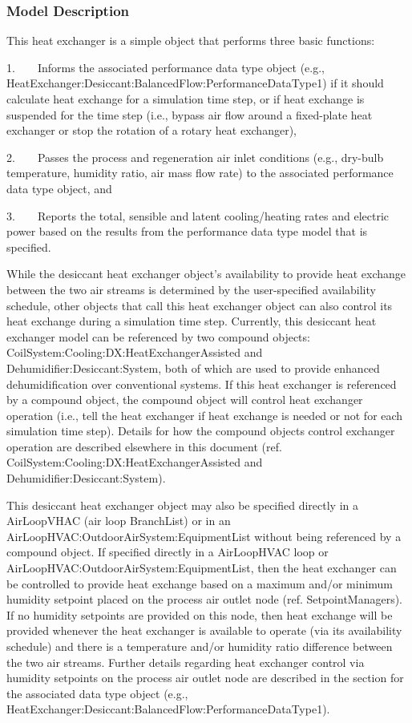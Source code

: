 \subsubsection{Model Description}\label{model-description-2-006}

This heat exchanger is a simple object that performs three basic functions:

1.~~~~Informs the associated performance data type object (e.g., \\ HeatExchanger:Desiccant:BalancedFlow:PerformanceDataType1) if it should calculate heat exchange for a simulation time step, or if heat exchange is suspended for the time step (i.e., bypass air flow around a fixed-plate heat exchanger or stop the rotation of a rotary heat exchanger),

2.~~~~Passes the process and regeneration air inlet conditions (e.g., dry-bulb temperature, humidity ratio, air mass flow rate) to the associated performance data type object, and

3.~~~~Reports the total, sensible and latent cooling/heating rates and electric power based on the results from the performance data type model that is specified.

While the desiccant heat exchanger object's availability to provide heat exchange between the two air streams is determined by the user-specified availability schedule, other objects that call this heat exchanger object can also control its heat exchange during a simulation time step. Currently, this desiccant heat exchanger model can be referenced by two compound objects: CoilSystem:Cooling:DX:HeatExchangerAssisted and Dehumidifier:Desiccant:System, both of which are used to provide enhanced dehumidification over conventional systems. If this heat exchanger is referenced by a compound object, the compound object will control heat exchanger operation (i.e., tell the heat exchanger if heat exchange is needed or not for each simulation time step). Details for how the compound objects control exchanger operation are described elsewhere in this document (ref. CoilSystem:Cooling:DX:HeatExchangerAssisted and Dehumidifier:Desiccant:System).

This desiccant heat exchanger object may also be specified directly in a AirLoopVHAC (air loop BranchList) or in an AirLoopHVAC:OutdoorAirSystem:EquipmentList without being referenced by a compound object. If specified directly in a AirLoopHVAC loop or AirLoopHVAC:OutdoorAirSystem:EquipmentList, then the heat exchanger can be controlled to provide heat exchange based on a maximum and/or minimum humidity setpoint placed on the process air outlet node (ref. SetpointManagers). If no humidity setpoints are provided on this node, then heat exchange will be provided whenever the heat exchanger is available to operate (via its availability schedule) and there is a temperature and/or humidity ratio difference between the two air streams. Further details regarding heat exchanger control via humidity setpoints on the process air outlet node are described in the section for the associated data type object (e.g., HeatExchanger:Desiccant:BalancedFlow:PerformanceDataType1).

